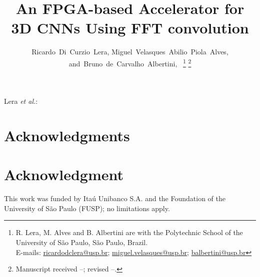 \documentclass[
  10pt,
  journal,
  \FORMAT-MODE,
  \TWOSIDE-MODE
]{IEEEtran}
\begin{document}

\title{An FPGA-based Accelerator for 3D CNNs Using FFT convolution}

\author{
  Ricardo~Di~Curzio~Lera, 
  Miguel~Velasques~Abilio~Piola~Alves,
  and~Bruno~de~Carvalho~Albertini,~%
  \thanks{%
    R. Lera, M. Alves and B. Albertini are with the Polytechnic School of the University of São Paulo, São Paulo, Brazil.\protect\\
    E-mails: \href{mailto:ricardodclera@usp.br}{ricardodclera@usp.br}; \href{mailto:me@somewhere.com}{miguel.velasques@usp.br}; \href{mailto:me@somewhere.com}{balbertini@usp.br}%
  }%
  \thanks{Manuscript received --; revised --.}%
}

\makeatletter
  {Lera \MakeLowercase{\textit{et al.}}: \@title}
\makeatother




\maketitle
\IEEEdisplaynontitleabstractindextext



\ifCLASSOPTIONcompsoc
\section*{Acknowledgments}
  \else
\section*{Acknowledgment}
\fi
  This work was funded by Itaú Unibanco S.A. and the Foundation of the University of São Paulo (FUSP); no limitations apply.




\end{document}
